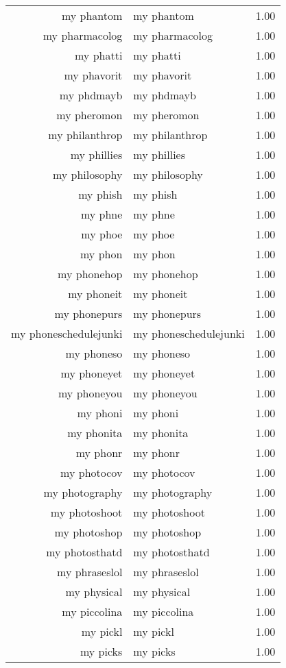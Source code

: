 \begin{table}[ht]
\begin{tabular}{rlr}
  my phantom & my phantom & 1.00 \\ 
  my pharmacolog & my pharmacolog & 1.00 \\ 
  my phatti & my phatti & 1.00 \\ 
  my phavorit & my phavorit & 1.00 \\ 
  my phdmayb & my phdmayb & 1.00 \\ 
  my pheromon & my pheromon & 1.00 \\ 
  my philanthrop & my philanthrop & 1.00 \\ 
  my phillies & my phillies & 1.00 \\ 
  my philosophy & my philosophy & 1.00 \\ 
  my phish & my phish & 1.00 \\ 
  my phne & my phne & 1.00 \\ 
  my phoe & my phoe & 1.00 \\ 
  my phon & my phon & 1.00 \\ 
  my phonehop & my phonehop & 1.00 \\ 
  my phoneit & my phoneit & 1.00 \\ 
  my phonepurs & my phonepurs & 1.00 \\ 
  my phoneschedulejunki & my phoneschedulejunki & 1.00 \\ 
  my phoneso & my phoneso & 1.00 \\ 
  my phoneyet & my phoneyet & 1.00 \\ 
  my phoneyou & my phoneyou & 1.00 \\ 
  my phoni & my phoni & 1.00 \\ 
  my phonita & my phonita & 1.00 \\ 
  my phonr & my phonr & 1.00 \\ 
  my photocov & my photocov & 1.00 \\ 
  my photography & my photography & 1.00 \\ 
  my photoshoot & my photoshoot & 1.00 \\ 
  my photoshop & my photoshop & 1.00 \\ 
  my photosthatd & my photosthatd & 1.00 \\ 
  my phraseslol & my phraseslol & 1.00 \\ 
  my physical & my physical & 1.00 \\ 
  my piccolina & my piccolina & 1.00 \\ 
  my pickl & my pickl & 1.00 \\ 
  my picks & my picks & 1.00 \\ 

\end{tabular}
\end{table}
